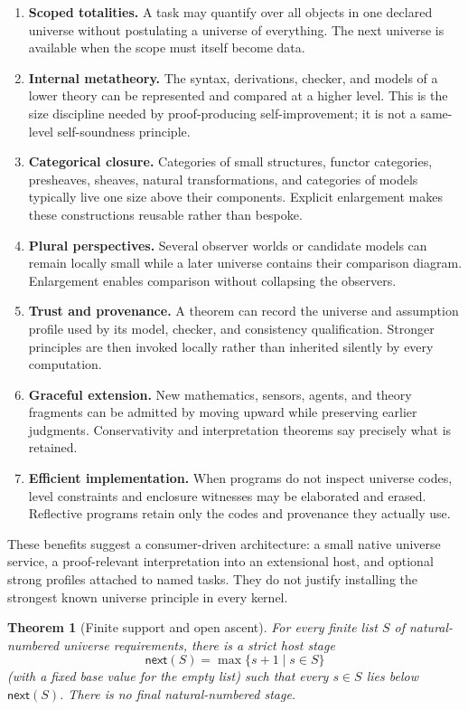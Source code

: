 \documentclass[11pt]{article}
\newtheorem{theorem}{Theorem}
\theoremstyle{definition}
\theoremstyle{remark}
\begin{document}
\begin{enumerate}
\item \textbf{Scoped totalities.}  A task may quantify over all objects in one
  declared universe without postulating a universe of everything.  The next
  universe is available when the scope must itself become data.
\item \textbf{Internal metatheory.}  The syntax, derivations, checker, and models
  of a lower theory can be represented and compared at a higher level.  This is
  the size discipline needed by proof-producing self-improvement; it is not a
  same-level self-soundness principle.
\item \textbf{Categorical closure.}  Categories of small structures, functor
  categories, presheaves, sheaves, natural transformations, and categories of
  models typically live one size above their components.  Explicit enlargement
  makes these constructions reusable rather than bespoke.
\item \textbf{Plural perspectives.}  Several observer worlds or candidate models
  can remain locally small while a later universe contains their comparison
  diagram.  Enlargement enables comparison without collapsing the observers.
\item \textbf{Trust and provenance.}  A theorem can record the universe and
  assumption profile used by its model, checker, and consistency qualification.
  Stronger principles are then invoked locally rather than inherited silently by
  every computation.
\item \textbf{Graceful extension.}  New mathematics, sensors, agents, and theory
  fragments can be admitted by moving upward while preserving earlier
  judgments.  Conservativity and interpretation theorems say precisely what is
  retained.
\item \textbf{Efficient implementation.}  When programs do not inspect universe
  codes, level constraints and enclosure witnesses may be elaborated and erased.
  Reflective programs retain only the codes and provenance they actually use.
\end{enumerate}

These benefits suggest a consumer-driven architecture: a small native universe
service, a proof-relevant interpretation into an extensional host, and optional
strong profiles attached to named tasks.  They do not justify installing the
strongest known universe principle in every kernel.

\begin{theorem}[Finite support and open ascent]
For every finite list $S$ of natural-numbered universe requirements, there is a
strict host stage
\[
  \mathsf{next}(S)=\max\{s+1\mid s\in S\}
\]
(with a fixed base value for the empty list) such that every $s\in S$ lies below
$\mathsf{next}(S)$.  There is no final natural-numbered stage.
\end{theorem}
\end{document}
